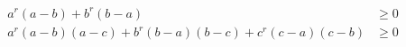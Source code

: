    \begin{align*}
   a^{r}(a-b)+b^{r}(b-a) &\ge 0 \\
   a^{r}(a-b)(a-c)+b^{r}(b-a)(b-c)+c^{r}(c-a)(c-b)  &\ge 0
   \end{align*}
